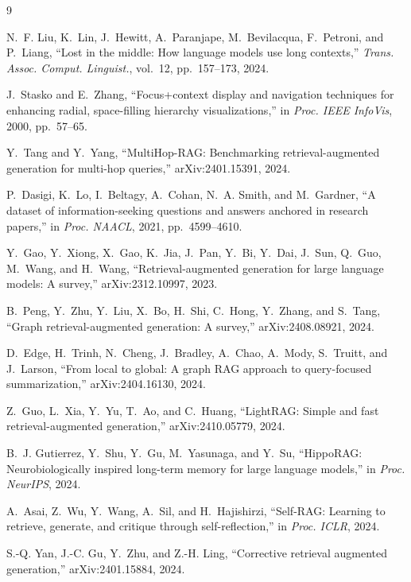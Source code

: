 \documentclass[conference,a4paper]{IEEEtran}
\begin{document}
\begin{thebibliography}{9}

N.~F. Liu, K.~Lin, J.~Hewitt, A.~Paranjape, M.~Bevilacqua, F.~Petroni, and P.~Liang, ``Lost in the middle: How language models use long contexts,'' \emph{Trans. Assoc. Comput. Linguist.}, vol.~12, pp.~157--173, 2024.

J.~Stasko and E.~Zhang, ``Focus+context display and navigation techniques for enhancing radial, space-filling hierarchy visualizations,'' in \emph{Proc. IEEE InfoVis}, 2000, pp.~57--65.

Y.~Tang and Y.~Yang, ``MultiHop-RAG: Benchmarking retrieval-augmented generation for multi-hop queries,'' arXiv:2401.15391, 2024.

P.~Dasigi, K.~Lo, I.~Beltagy, A.~Cohan, N.~A. Smith, and M.~Gardner, ``A dataset of information-seeking questions and answers anchored in research papers,'' in \emph{Proc. NAACL}, 2021, pp.~4599--4610.

Y.~Gao, Y.~Xiong, X.~Gao, K.~Jia, J.~Pan, Y.~Bi, Y.~Dai, J.~Sun, Q.~Guo, M.~Wang, and H.~Wang, ``Retrieval-augmented generation for large language models: A survey,'' arXiv:2312.10997, 2023.

B.~Peng, Y.~Zhu, Y.~Liu, X.~Bo, H.~Shi, C.~Hong, Y.~Zhang, and S.~Tang, ``Graph retrieval-augmented generation: A survey,'' arXiv:2408.08921, 2024.

D.~Edge, H.~Trinh, N.~Cheng, J.~Bradley, A.~Chao, A.~Mody, S.~Truitt, and J.~Larson, ``From local to global: A graph RAG approach to query-focused summarization,'' arXiv:2404.16130, 2024.

Z.~Guo, L.~Xia, Y.~Yu, T.~Ao, and C.~Huang, ``LightRAG: Simple and fast retrieval-augmented generation,'' arXiv:2410.05779, 2024.

B.~J. Gutierrez, Y.~Shu, Y.~Gu, M.~Yasunaga, and Y.~Su, ``HippoRAG: Neurobiologically inspired long-term memory for large language models,'' in \emph{Proc. NeurIPS}, 2024.

A.~Asai, Z.~Wu, Y.~Wang, A.~Sil, and H.~Hajishirzi, ``Self-RAG: Learning to retrieve, generate, and critique through self-reflection,'' in \emph{Proc. ICLR}, 2024.

S.-Q. Yan, J.-C. Gu, Y.~Zhu, and Z.-H. Ling, ``Corrective retrieval augmented generation,'' arXiv:2401.15884, 2024.

\end{thebibliography}
\end{document}
